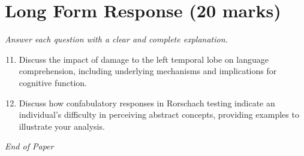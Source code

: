 \documentclass[12pt]{article}
\begin{document}
\section*{Long Form Response (20 marks)}
\textit{Answer each question with a clear and complete explanation.}
\begin{enumerate}[label=\arabic*.]
\setcounter{enumi}{10}
\item Discuss the impact of damage to the left temporal lobe on language comprehension, including underlying mechanisms and implications for cognitive function.
\item Discuss how confabulatory responses in Rorschach testing indicate an individual's difficulty in perceiving abstract concepts, providing examples to illustrate your analysis.
\end{enumerate}

\vfill
\noindent\textit{End of Paper}
\end{document}
